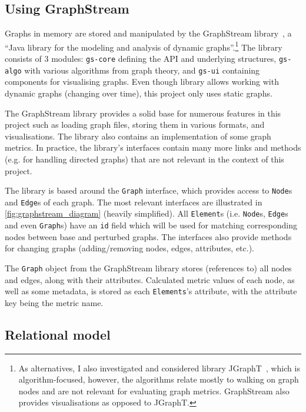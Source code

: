 \subsection{Using GraphStream}\label{sec:graphstream}

Graphs in memory are stored and manipulated by the GraphStream library~\cite{DutotGraphStreamToolBridging2007}, a \enquote{Java library for the modeling and analysis of dynamic graphs}.\footnote{As alternatives, I also investigated and considered library JGraphT~\cite{Michail2019}, which is algorithm-focused, however, the algorithms relate mostly to walking on graph nodes and are not relevant for evaluating graph metrics.
GraphStream also provides visualisations as opposed to JGraphT.}
The library consists of 3 modules: \texttt{gs-core} defining the API and underlying structures, \texttt{gs-algo} with various algorithms from graph theory, and \texttt{gs-ui} containing components for visualising graphs.
Even though library allows working with dynamic graphs (changing over time), this project only uses static graphs.

The GraphStream library provides a solid base for numerous features in this project such as loading graph files, storing them in various formats, and visualisations.
The library also contains an implementation of some graph metrics.
In practice, the library's interfaces contain many more links and methods (e.g. for handling directed graphs) that are not relevant in the context of this project.



The library is based around the \texttt{Graph} interface, which provides access to \texttt{Node}s and \texttt{Edge}s of each graph.
The most relevant interfaces are illustrated in \autoref{fig:graphstream_diagram} (heavily simplified).
All \texttt{Element}s (i.e. \texttt{Node}s, \texttt{Edge}s and even \texttt{Graph}s) have an \texttt{id} field which will be used for matching corresponding nodes between base and perturbed graphs.
The interfaces also provide methods for changing graphs (adding/removing nodes, edges, attributes, etc.).

The \texttt{Graph} object from the GraphStream library stores (references to) all nodes and edges, along with their attributes.
Calculated metric values of each node, as well as some metadata, is stored as each \texttt{Elements}'s attribute, with the attribute key being the metric name.

\subsection{Relational model}

